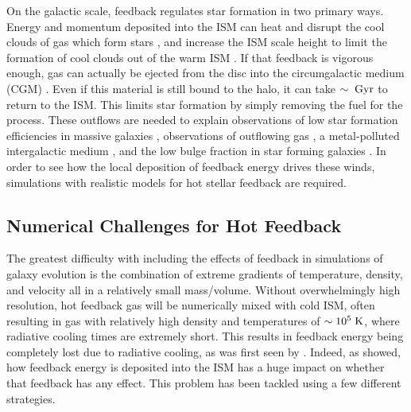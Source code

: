 On the galactic scale, feedback regulates star formation in two primary ways.
Energy and momentum deposited into the ISM can heat and disrupt the cool clouds
of gas which form stars \citep{Rogers2013}, and increase the ISM scale height to
limit the formation of cool clouds out of the warm ISM
\citep{Ostriker2010,Benincasa2016}.  If that feedback is vigorous enough, gas
can actually be ejected from the disc into the circumgalactic medium (CGM)
\citep{Larson1974,Heckman1987,Hopkins2012b}.  Even if this material is still
bound to the halo, it can take $\sim\;\rm{Gyr}$ to return to the ISM.  This
limits star formation by simply removing the fuel for the process.  These
outflows are needed to explain observations of low star formation efficiencies
in massive galaxies \citep{Behroozi2013,Moster2013}, observations of outflowing
gas \citep{Lynds1963,Heckman1987}, a metal-polluted intergalactic medium
\citep{Shen2010}, and the low bulge fraction in star forming galaxies
\citep{Brook2012}.  In order to see how the local deposition of feedback energy
drives these winds, simulations with realistic models for hot stellar feedback
are required.

\subsection{Numerical Challenges for Hot Feedback}
The greatest difficulty with including the effects of feedback in simulations of
galaxy evolution is the combination of extreme gradients of temperature,
density, and velocity all in a relatively small mass/volume.  Without
overwhelmingly high resolution, hot feedback gas will be numerically mixed with
cold ISM, often resulting in gas with relatively high density and temperatures
of $\sim10^5\;\rm{K}$, where radiative cooling times are extremely short.  This
results in feedback energy being completely lost due to radiative cooling, as
was first seen by \citet{Katz1992}.  Indeed, as \citet{Thacker2000} showed, how
feedback energy is deposited into the ISM has a huge impact on whether that
feedback has any effect.  This problem has been tackled using a few different
strategies.  


